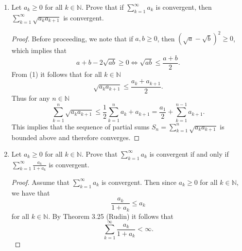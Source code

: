 \documentclass[12pt]{article}
\begin{document}
\begin{enumerate}
\begin{proof}
\begin{equation*}
                \end{equation*}
            \end{proof}
        \item Let $a_k\geq0$ for all $k\in\mathbb{N}$. Prove that if
            $\sum_{k=1}^{\infty}a_k$ is convergent, then
            $\sum_{k=1}^{\infty}\sqrt{a_ka_{k+1}}$ is convergent.
            \begin{proof}
                Before proceeding, we note that if $a, b\geq 0$, then
                $(\sqrt{a}-\sqrt{b})^2\geq 0$, which implies that 
                \begin{equation}
                    a+b-2\sqrt{ab}\geq 0\Leftrightarrow
                    \sqrt{ab}\leq\frac{a+b}{2}.  
                \end{equation}
                From (1) it follows that for all $k\in\mathbb{N}$
                \begin{equation*}
                    \sqrt{a_ka_{k+1}}\leq\frac{a_k+a_{k+1}}{2}. 
                \end{equation*}
                Thus for any $n\in\mathbb{N}$
                \begin{equation*}
                    \sum_{k=1}^{n}\sqrt{a_ka_{k+1}}
                    \leq\frac{1}{2}\sum_{k=1}^{n}a_k+a_{k+1}
                    =\frac{a_1}{2}+\sum_{k=1}^{n-1}a_{k+1}.
                \end{equation*}
                This implies that the sequence of partial sums 
                $S_n=\sum_{k=1}^{n}\sqrt{a_ka_{k+1}}$ is bounded above and
                therefore converges. 
            \end{proof}
        \item Let $a_k\geq 0$ for all $k\in\mathbb{N}$. Prove that
            $\sum_{k=1}^{\infty}a_k$ is convergent if and only if
            $\sum_{k=1}^{\infty}\frac{a_k}{1+a_k}$ is convergent. 
            \begin{proof}
                Assume that $\sum_{k=1}^{\infty}a_k$ is convergent. Then
                since $a_k\geq 0$ for all $k\in\mathbb{N}$, we have that
                \begin{equation*}
                    \frac{a_k}{1+a_k}\leq a_k
                \end{equation*}
                for all $k\in\mathbb{N}$. By Theorem 3.25 (Rudin) it follows
                that 
                \begin{equation*}
                    \sum_{k=1}^{\infty}\frac{a_k}{1+a_k}<\infty.
                \end{equation*}

\end{proof}
\end{enumerate}
\end{document}
